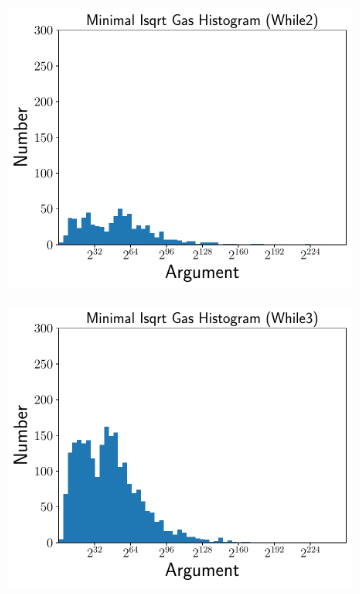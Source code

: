 \begin{figure}[p]
    \begin{subfigure}[t]{0.45\textwidth}
    \includegraphics[width=\textwidth]{plots/minimal_hist_While2_er.pdf}
    \end{subfigure}
    \begin{subfigure}[t]{0.45\textwidth}
    \includegraphics[width=\textwidth]{plots/minimal_hist_While3_er.pdf}
    \end{subfigure}


\end{figure}
